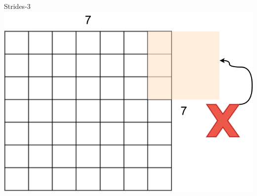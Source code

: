 \documentclass[default, aspectratio=169]{beamer}
\begin{document}
\begin{frame}{Strides-3}
		\hspace{0.2cm}
		\includegraphics[keepaspectratio, scale=0.2]{pic/Stride11.png}
		
		
	\end{frame}
\end{document}
